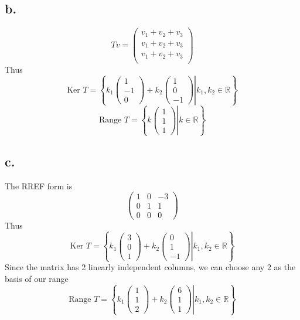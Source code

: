 \documentclass[11pt]{article}
\theoremstyle{mystyle}
\theoremstyle{definition}
\begin{document}
\subsection*{b.}
\[
  Tv = 
  \begin{pmatrix}
    v_1 + v_2 + v_3 \\
    v_1 + v_2 + v_3 \\
    v_1 + v_2 + v_3 \\
  \end{pmatrix}
\]
Thus 
\[
  \text{Ker } T = 
  \left\{
    \left. k_1
    \begin{pmatrix}
      1 \\
      -1 \\
      0
    \end{pmatrix} + k_2
    \begin{pmatrix}
      1 \\
      0 \\
      -1
    \end{pmatrix} 
    \right| k_1, k_2 \in \mathbb{R}
    \right\}
\]
\[
  \text{Range } T = 
  \left\{
    \left. k
    \begin{pmatrix}
      1 \\
      1 \\
      1
    \end{pmatrix}
    \right| k \in \mathbb{R}
  \right\}
\]
\subsection*{c.}
The RREF form is 
\[
  \begin{pmatrix}
    1 & 0 & -3 \\
    0 & 1 & 1 \\
    0 & 0 & 0
  \end{pmatrix}
\]
Thus 
\[
  \text{Ker } T = 
  \left\{
    \left. k_1
    \begin{pmatrix}
     3 \\ 0 \\ 1
    \end{pmatrix}
    + k_2 
    \begin{pmatrix}
      0 \\ 1 \\ -1
    \end{pmatrix}
    \right| k_1, k_2 \in \mathbb{R}
    \right\}
\]
Since the matrix has 2 linearly independent columns, we can choose any 2 as the basis of our range
\[
  \text{Range } T = 
  \left\{
    \left. k_1
    \begin{pmatrix}
      1 \\ 1 \\ 2
    \end{pmatrix}
    + k_2 
    \begin{pmatrix}
      6 \\ 1 \\ 1
    \end{pmatrix}
    \right| k_1, k_2 \in \mathbb{R}
    \right\}
\]
\clearpage
\end{document}
